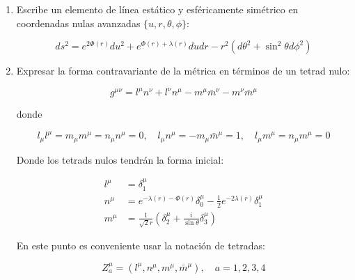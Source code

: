 \begin{enumerate}[1.]
    \item Escribe un elemento de línea estático y esféricamente simétrico en coordenadas nulas avanzadas $\{u, r, \theta, \phi\}$:

          \begin{equation}
              ds^2 = e^{2 \Phi(r)} du^2 + e^{\Phi(r) + \lambda(r)} du dr - r^2 (d\theta^2 + \sin^2 \theta d\phi^2)
          \end{equation}

    \item Expresar la forma contravariante de la métrica en términos de un tetrad nulo:

          \begin{equation}
              g^{\mu \nu} = l^\mu n^\nu + l^\nu n^\mu - m^\mu \bar{m}^\nu - m^\nu \bar{m}^\mu
              \label{MetricaTetrada}
          \end{equation}

          donde

          \begin{equation}
              l_\mu l^\mu = m_\mu m^\mu = n_\mu n^\mu = 0, \quad l_\mu n^\mu = -m_\mu \bar{m}^\mu = 1, \quad l_\mu m^\mu = n_\mu m^\mu = 0
          \end{equation}

          Donde los tetrads nulos tendrán la forma inicial:

          \begin{equation}
              \begin{aligned}
                  l^\mu & = \delta_1^\mu                                                                          \\
                  n^\mu & = e^{-\lambda(r) - \Phi(r)} \delta_0^\mu - \frac{1}{2} e^{-2 \lambda(r)} \delta_1^\mu   \\
                  m^\mu & = \frac{1}{\sqrt{2} r} \left( \delta_2^\mu + \frac{i}{\sin \theta} \delta_3^\mu \right)
              \end{aligned}
          \end{equation}

          En este punto es conveniente usar la notación de tetradas:

          \begin{equation}
              Z_a^\mu = (l^\mu, n^\mu, m^\mu, \bar{m}^\mu), \quad a = 1, 2, 3, 4
          \end{equation}


\end{enumerate}
